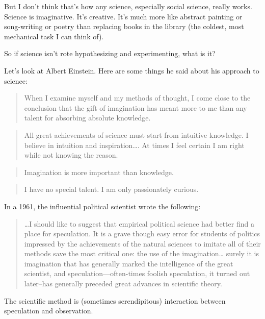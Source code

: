 \documentclass[]{book}
\theoremstyle{definition}
\theoremstyle{definition}
\theoremstyle{definition}
\theoremstyle{remark}
\begin{document}
But I don't think that's how any science, especially social science,
really works. Science is imaginative. It's creative. It's much more like
abstract painting or song-writing or poetry than replacing books in the
library (the coldest, most mechanical task I can think of).

So if science isn't rote hypothesizing and experimenting, what is it?

Let's look at Albert Einstein. Here are some things he said about his
approach to science:

\begin{quote}
When I examine myself and my methods of thought, I come close to the
conclusion that the gift of imagination has meant more to me than any
talent for absorbing absolute knowledge.
\end{quote}

\begin{quote}
All great achievements of science must start from intuitive knowledge. I
believe in intuition and inspiration\ldots{}. At times I feel certain I
am right while not knowing the reason.
\end{quote}

\begin{quote}
Imagination is more important than knowledge.
\end{quote}

\begin{quote}
I have no special talent. I am only passionately curious.
\end{quote}

In a 1961, the influential political scientist wrote the following:

\begin{quote}
\ldots{}I should like to suggest that empirical political science had
better find a place for speculation. It is a grave though easy error for
students of politics impressed by the achievements of the natural
sciences to imitate all of their methods save the most critical one: the
use of the imagination\ldots{} surely it is imagination that has
generally marked the intelligence of the great scientist, and
speculation---often-times foolish speculation, it turned out later--has
generally preceded great advances in scientific theory.
\end{quote}

The scientific method is (sometimes serendipitous) interaction between
speculation and observation.
\end{document}
